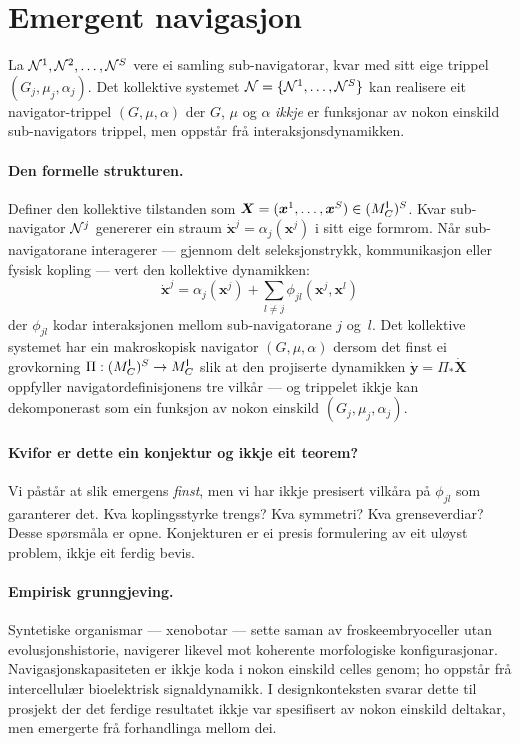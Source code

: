 \section{Emergent navigasjon}

\begin{konmark}\label{conj:L.7.3}
La $\mathcal{N}^1, \mathcal{N}^2, \ldots, \mathcal{N}^S$ vere ei samling
sub-navigatorar, kvar med sitt eige trippel
$(G_j, \mu_j, \alpha_j)$. Det kollektive systemet
$\mathcal{N} = \{\mathcal{N}^1, \ldots, \mathcal{N}^S\}$ kan realisere eit
navigator-trippel $(G, \mu, \alpha)$ der $G$, $\mu$ og $\alpha$
\emph{ikkje} er funksjonar av nokon einskild sub-navigators
trippel, men oppstår frå interaksjonsdynamikken.
\end{konmark}

\paragraph{Den formelle strukturen.}
Definer den kollektive tilstanden som
$\bm{X} = (\bm{x}^1, \ldots, \bm{x}^S) \in (M^{\mathsf{I}}_C)^S$.
Kvar sub-navigator $\mathcal{N}^j$ genererer ein straum
$\dot{\bm{x}}^j = \alpha_j(\bm{x}^j)$ i sitt eige formrom.
Når sub-navigatorane interagerer --- gjennom delt seleksjonstrykk,
kommunikasjon eller fysisk kopling --- vert den kollektive
dynamikken:
\[
  \dot{\bm{x}}^j = \alpha_j(\bm{x}^j)
  + \sum_{l \neq j} \phi_{jl}(\bm{x}^j, \bm{x}^l)
\]
der $\phi_{jl}$ kodar interaksjonen mellom sub-navigatorane $j$
og~$l$. Det kollektive systemet har ein makroskopisk navigator
$(G, \mu, \alpha)$ dersom det finst ei grovkorning
$\Pi : (M^{\mathsf{I}}_C)^S \to M^{\mathsf{I}}_C$ slik at den projiserte dynamikken
$\dot{\bm{y}} = \Pi_* \dot{\bm{X}}$ oppfyller
navigatordefinisjonens tre vilkår --- og trippelet ikkje kan
dekomponerast som ein funksjon av nokon einskild
$(G_j, \mu_j, \alpha_j)$.

\paragraph{Kvifor er dette ein konjektur og ikkje eit teorem?}
Vi påstår at slik emergens \emph{finst}, men vi har ikkje
presisert vilkåra på $\phi_{jl}$ som garanterer det. Kva
koplingsstyrke trengs? Kva symmetri? Kva grenseverdiar? Desse
spørsmåla er opne. Konjekturen er ei presis formulering av eit
uløyst problem, ikkje eit ferdig bevis.

\paragraph{Empirisk grunngjeving.}
Syntetiske organismar --- xenobotar --- sette saman av
froskeembryoceller utan evolusjonshistorie, navigerer likevel mot
koherente morfologiske konfigurasjonar. Navigasjonskapasiteten er
ikkje koda i nokon einskild celles genom; ho oppstår frå
intercellulær bioelektrisk signaldynamikk. I designkonteksten
svarar dette til prosjekt der det ferdige resultatet ikkje var
spesifisert av nokon einskild deltakar, men emergerte frå
forhandlinga mellom dei.

